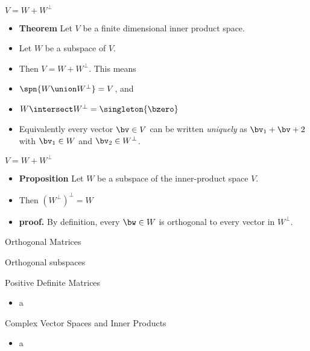 \documentclass{beamer}
\begin{document}
\begin{frame}{$V=W+W^{\perp}$}
\begin{itemize}
\item \textbf{Theorem} Let $V$ be a finite dimensional inner product space.
\item Let $W$ be a subspace of $V$.
\item Then $V= W + W^{\perp}$. This means
\item $\spn{W\union W^{\perp}} = V$, and
\item $W\intersect W^{\perp} = \singleton{\bzero}$
\item Equivalently every vector $\bv\in V$ can be written \emph{uniquely} as
 $\bv_1+\bv+2$ with $\bv_1\in W$ and $\bv_2\in W^{\perp}$.
\end{itemize}
\end{frame}

\begin{frame}{$V=W+W^{\perp}$}
\begin{itemize}
\item \textbf{Proposition} Let $W$ be a subspace of the inner-product space $V$.
\item Then $\left(W^{\perp}\right)^{\perp} = W$
\item \textbf{proof.} By definition, every $\bw\in W$ is orthogonal to every vector in $W^{\perp}$.
\end{itemize}
\end{frame}

\begin{frame}{Orthogonal Matrices}


\end{frame}


\begin{frame}{Orthogonal subspaces}


\end{frame}

\begin{frame}{Positive Definite Matrices}

\begin{itemize}
\item a
\end{itemize}
\end{frame}

\begin{frame}{Complex Vector Spaces and Inner Products}

\begin{itemize}
\item a
\end{itemize}
\end{frame}


\end{document}
